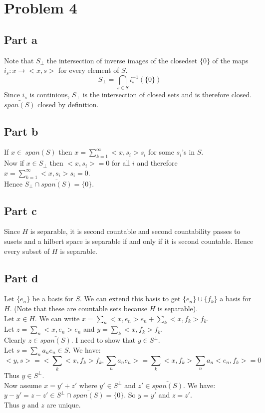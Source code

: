\documentclass[12pt]{article}
\begin{document}
\clearpage
\section*{Problem 4}
\subsection*{Part a}
Note that $S_{\perp}$ the intersection of inverse images of the closedset $\{0\}$ of the maps\\ 
$i_s : x \rightarrow <x,s>$ for every element of $S$. \\
$$S_{\perp} = \bigcap_{s \in S} i_s^{-1}(\{0\})$$
Since $i_s$ is continious, $S_{\perp}$ is the intersection of closed sets and is therefore closed. \\
$\bar{span(S)}$ closed by definition. 
\subsection*{Part b}
If $x \in \ span(S)$ then $x=\sum_{k=1}^{\infty} <x,s_i>s_i$ for some $s_i$'s in $S$. \\
Now if $x \in S_{\perp}$ then $<x,s_i>=0$ for all $i$ and therefore
$x=\sum_{k=1}^{\infty} <x,s_i>s_i=0$. \\
Hence $S_{\perp} \cap \bar{span(S)}= \{0\}$.
\subsection*{Part c}
Since $H$ is separable, it is second countable and second countability passes to susets and a hilbert space is separable if and only if it is second countable. Hence every subset of $H$ is separable.
\subsection*{Part d}
Let $\{e_n\}$ be a basis for $S$. We can extend this basis to get $\{e_n\} \cup \{f_k\}$ a basis for $H$. (Note that these are countable sets because $H$ is separable). \\
Let $x \in H$. We can write $x = \sum_n<x,e_n> e_n + \sum_k <x,f_k>f_k$. \\
Let $z= \sum_n<x,e_n> e_n$ and $y=\sum_k <x,f_k>f_k$. \\
Clearly $z \in \bar{span(S)}$. I need to show that $y \in S^{\perp}$. \\
Let $s=\sum_n a_ne_n \in S$. We have:
$$<y,s>=<\sum_k <x,f_k>f_k,\sum_n a_ne_n>=\sum_k <x,f_k> \sum_n a_n <e_n,f_k>=0$$
Thus $y \in S^{\perp}$. \\
Now assume $x = y'+z'$ where $y' \in S^{\perp}$ and $z'  \in  \bar{span(S)}$. We have:\\
$y-y'=z-z' \in S^{\perp} \cap  \bar{span(S)} = \{0\}$. So $y=y'$ and $z=z'$. \\
Thus $y$ and $z$ are unique. \\
\end{document}
